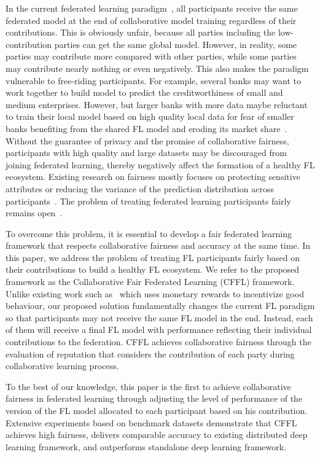 \documentclass{article}
\begin{document}
In the current federated learning paradigm~\cite{mcmahan2016federated}, all participants receive the same federated model at the end of collaborative model training regardless of their contributions. This is obviously unfair, because all parties including the low-contribution parties can get the same global model. However, in reality, some parties may contribute more compared with other parties, while some parties may contribute nearly nothing or even negatively. This also makes the paradigm vulnerable to free-riding participants. For example, several banks may want to work together to build model to predict the creditworthiness of small and medium enterprises. However, but larger banks with more data maybe reluctant to train their local model based on high quality local data for fear of smaller banks benefiting from the shared FL model and eroding its market share~\cite{FL2019}. Without the guarantee of privacy and the promise of collaborative fairness, participants with high quality and large datasets may be discouraged from joining federated learning, thereby negatively affect the formation of a healthy FL ecosystem. Existing research on fairness mostly focuses on protecting sensitive attributes or reducing the variance of the prediction distribution across participants~\cite{cummings2019compatibility,jagielski2018differentially}. The problem of treating federated learning participants fairly remains open~\cite{FL2019}.

To overcome this problem, it is essential to develop a fair federated learning framework that respects collaborative fairness and accuracy at the same time. In this paper, we address the problem of treating FL participants fairly based on their contributions to build a healthy FL ecosystem. We refer to the proposed framework as the Collaborative Fair Federated Learning (CFFL) framework. Unlike existing work such as~\cite{Yu-et-al:2020AIES} which uses monetary rewards to incentivize good behaviour, our proposed solution fundamentally changes the current FL paradigm so that participants may not receive the same FL model in the end. Instead, each of them will receive a final FL model with performance reflecting their individual contributions to the federation. CFFL achieves collaborative fairness through the evaluation of reputation that considers the contribution of each party during collaborative learning process. 

To the best of our knowledge, this paper is the first to achieve collaborative fairness in federated learning through adjusting the level of performance of the version of the FL model allocated to each participant based on his contribution. Extensive experiments based on benchmark datasets %
demonstrate that CFFL achieves high fairness, delivers comparable accuracy to existing %
distributed deep learning framework, and outperforms standalone deep learning framework.
\end{document}
